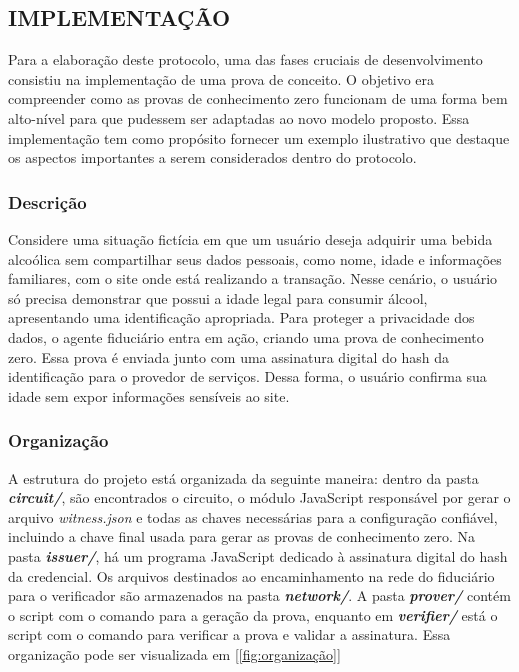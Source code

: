 \newpage
\subsection{IMPLEMENTAÇÃO}

Para a elaboração deste protocolo, uma das fases cruciais de desenvolvimento consistiu na implementação de uma prova de conceito. O objetivo era compreender como as provas de 
conhecimento zero funcionam de uma forma bem alto-nível para que pudessem ser adaptadas ao novo modelo proposto. Essa implementação tem como propósito fornecer um exemplo ilustrativo que destaque os aspectos importantes a serem considerados dentro do protocolo.


\subsubsection{Descrição}

Considere uma situação fictícia em que um usuário deseja adquirir uma bebida alcoólica sem compartilhar seus dados pessoais, como nome, idade e informações familiares, com o site onde está realizando a transação. Nesse cenário, o usuário só precisa demonstrar que possui a idade legal para consumir álcool, apresentando uma identificação apropriada. Para proteger a privacidade dos dados, o agente fiduciário entra em ação, criando uma prova de conhecimento zero. Essa prova é enviada junto com uma assinatura digital do hash da identificação para o provedor de serviços. Dessa forma, o usuário confirma sua idade sem expor informações sensíveis ao site.

\subsubsection{Organização}

A estrutura do projeto está organizada da seguinte maneira: dentro da pasta \textbf{\textit{circuit/}}, são encontrados o circuito, o módulo JavaScript responsável por gerar o arquivo \textit{witness.json} e todas as chaves necessárias para a configuração confiável, incluindo a chave final usada para gerar as provas de conhecimento zero. Na pasta \textbf{\textit{issuer/}}, há um programa JavaScript dedicado à assinatura digital do hash da credencial. Os arquivos destinados ao encaminhamento na rede do fiduciário para o verificador são armazenados na pasta \textbf{\textit{network/}}. A pasta \textbf{\textit{prover/}} contém o script com o comando para a geração da prova, enquanto em \textbf{\textit{verifier/}} está o script com o comando para verificar a prova e validar a assinatura. Essa organização pode ser visualizada em [\ref{fig:organização}]

